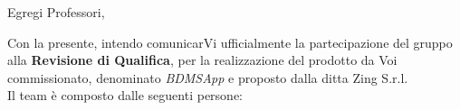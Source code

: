 \documentclass[10pt,a4paper,sans]{moderncv}        %
\begin{document}
\date{\emph{2015-05-27}}
\opening{Egregi Professori,}
\makelettertitle

Con la presente, intendo comunicarVi ufficialmente la partecipazione del gruppo \groupName{} alla \textbf{Revisione di Qualifica}, per la realizzazione del prodotto da Voi commissionato, denominato \textit{BDMSApp} e proposto dalla ditta Zing S.r.l.\\
Il team è composto dalle seguenti persone: 
\end{document}
